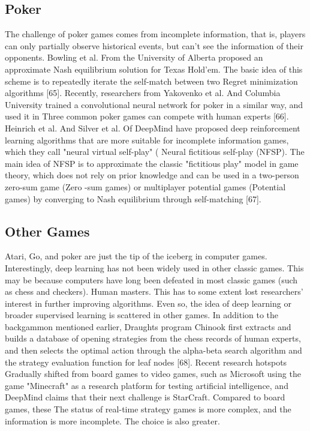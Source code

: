 \documentclass[11pt,en]{elegantpaper}
\begin{document}
\subsection{Poker}
The challenge of poker games comes from incomplete information, that is, players can only partially observe historical events, but can't see the information of their opponents. Bowling et al. From the University of Alberta proposed an approximate Nash equilibrium solution for Texas Hold'em. The basic idea of this scheme is to repeatedly iterate the self-match between two Regret minimization algorithms [65]. Recently, researchers from Yakovenko et al. And Columbia University trained a convolutional neural network for poker in a similar way, and used it in Three common poker games can compete with human experts [66]. Heinrich et al. And Silver et al. Of DeepMind have proposed deep reinforcement learning algorithms that are more suitable for incomplete information games, which they call "neural virtual self-play" ( Neural fictitious self-play (NFSP). The main idea of NFSP is to approximate the classic "fictitious play" model in game theory, which does not rely on prior knowledge and can be used in a two-person zero-sum game (Zero -sum games) or multiplayer potential games (Potential games) by converging to Nash equilibrium through self-matching [67].

\subsection{Other Games}
Atari, Go, and poker are just the tip of the iceberg in computer games. Interestingly, deep learning has not been widely used in other classic games. This may be because computers have long been defeated in most classic games (such as chess and checkers). Human masters. This has to some extent lost researchers' interest in further improving algorithms. Even so, the idea of ​​deep learning or broader supervised learning is scattered in other games. In addition to the backgammon mentioned earlier, Draughts program Chinook first extracts and builds a database of opening strategies from the chess records of human experts, and then selects the optimal action through the alpha-beta search algorithm and the strategy evaluation function for leaf nodes [68]. Recent research hotspots Gradually shifted from board games to video games, such as Microsoft using the game "Minecraft" as a research platform for testing artificial intelligence, and DeepMind claims that their next challenge is StarCraft. Compared to board games, these The status of real-time strategy games is more complex, and the information is more incomplete. The choice is also greater.
\end{document}
